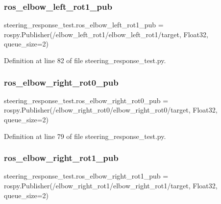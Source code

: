 \subsubsection{\texorpdfstring{ros\_elbow\_left\_rot1\_pub}{ros\_elbow\_left\_rot1\_pub}}
{\footnotesize\ttfamily steering\+\_\+response\+\_\+test.\+ros\+\_\+elbow\+\_\+left\+\_\+rot1\+\_\+pub = rospy.\+Publisher(\textquotesingle{}/elbow\+\_\+left\+\_\+rot1/elbow\+\_\+left\+\_\+rot1/target\textquotesingle{}, Float32, queue\+\_\+size=2)}



Definition at line 82 of file steering\+\_\+response\+\_\+test.\+py.

\mbox{\label{namespacesteering__response__test_a804745f34c187792f567f9bd8744db70}} 
\subsubsection{\texorpdfstring{ros\_elbow\_right\_rot0\_pub}{ros\_elbow\_right\_rot0\_pub}}
{\footnotesize\ttfamily steering\+\_\+response\+\_\+test.\+ros\+\_\+elbow\+\_\+right\+\_\+rot0\+\_\+pub = rospy.\+Publisher(\textquotesingle{}/elbow\+\_\+right\+\_\+rot0/elbow\+\_\+right\+\_\+rot0/target\textquotesingle{}, Float32, queue\+\_\+size=2)}



Definition at line 79 of file steering\+\_\+response\+\_\+test.\+py.

\mbox{\label{namespacesteering__response__test_a789e2c971f8b6c9acb1341b931ae5a07}} 
\subsubsection{\texorpdfstring{ros\_elbow\_right\_rot1\_pub}{ros\_elbow\_right\_rot1\_pub}}
{\footnotesize\ttfamily steering\+\_\+response\+\_\+test.\+ros\+\_\+elbow\+\_\+right\+\_\+rot1\+\_\+pub = rospy.\+Publisher(\textquotesingle{}/elbow\+\_\+right\+\_\+rot1/elbow\+\_\+right\+\_\+rot1/target\textquotesingle{}, Float32, queue\+\_\+size=2)}



